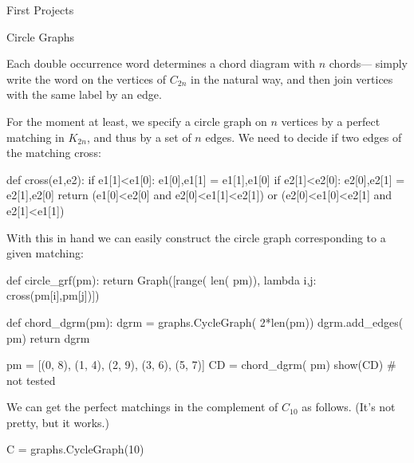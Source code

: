 \begin{chap}{First Projects}
\begin{sect}{Circle Graphs}
\begin{para}
Each double occurrence word determines a chord diagram with $n$ chords---
simply write the word on the vertices of $C_{2n}$ in the natural way, and then
join vertices with the same label by an edge.
\end{para}
%
\begin{para}
For the moment at least, we specify a circle graph on $n$ vertices by a 
perfect matching in $K_{2n}$, and thus by a set of $n$ edges.
We need to decide if two edges of the matching cross:
\end{para}
%
\begin{sagecode}
\begin{sageinput}
def cross(e1,e2):
    if e1[1]<e1[0]: e1[0],e1[1] = e1[1],e1[0]
    if e2[1]<e2[0]: e2[0],e2[1] = e2[1],e2[0]
    return (e1[0]<e2[0] and e2[0]<e1[1]<e2[1]) or (e2[0]<e1[0]<e2[1] and e2[1]<e1[1])
\end{sageinput}
\end{sagecode}
%
\begin{para}
With this in hand we can easily construct the circle graph corresponding
to a given matching:
\end{para}
%
\begin{sagecode}
\begin{sageinput}
def circle_grf(pm):
    return Graph([range( len( pm)), lambda i,j: cross(pm[i],pm[j])])
\end{sageinput}
\end{sagecode}
%
\begin{sagecode}
\begin{sageinput}
def chord_dgrm(pm):
    dgrm = graphs.CycleGraph( 2*len(pm))
    dgrm.add_edges( pm)
    return dgrm
\end{sageinput}
\end{sagecode}
%
\begin{sagecode}
\begin{sageinput}
pm = [(0, 8), (1, 4), (2, 9), (3, 6), (5, 7)]
CD = chord_dgrm( pm)
show(CD)  # not tested
\end{sageinput}
\begin{sageoutput}
\end{sageoutput}
\end{sagecode}
%
\begin{para}
We can get the perfect matchings in the complement of $C_{10}$ as follows.
(It's not pretty, but it works.)
\end{para}
%
\begin{sagecode}
\begin{sageinput}
C = graphs.CycleGraph(10)

\end{sageinput}
\end{sagecode}
\end{sect}
\end{chap}
